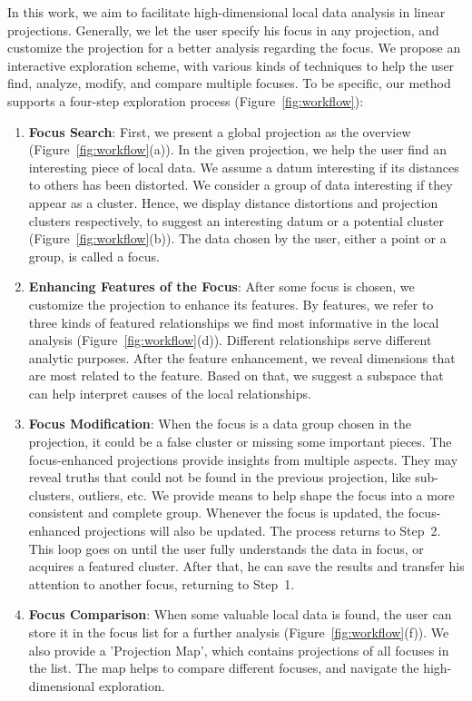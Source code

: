 In this work, we aim to facilitate high-dimensional local data analysis in linear projections. Generally, we let the user specify his focus in any projection, and customize the projection for a better analysis regarding the focus. We propose an interactive exploration scheme, with various kinds of techniques to help the user find, analyze, modify, and compare multiple focuses. To be specific, our method supports a four-step exploration process (Figure~\ref{fig:workflow}):
\begin{enumerate}[Step. 1:]
 \item \textbf{Focus Search}: First, we present a global projection as the overview (Figure~\ref{fig:workflow}(a)). In the given projection, we help the user find an interesting piece of local data. We assume a datum interesting if its distances to others has been distorted. We consider a group of data interesting if they appear as a cluster. Hence, we display distance distortions and projection clusters respectively, to suggest an interesting datum or a potential cluster (Figure~\ref{fig:workflow}(b)). The data chosen by the user, either a point or a group, is called a focus.
 \item \textbf{Enhancing Features of the Focus}: After some focus is chosen, we customize the projection to enhance its features. By features, we refer to three kinds of featured relationships we find most informative in the local analysis (Figure~\ref{fig:workflow}(d)). Different relationships serve different analytic purposes. After the feature enhancement, we reveal dimensions that are most related to the feature. Based on that, we suggest a subspace that can help interpret causes of the local relationships.
 \item \textbf{Focus Modification}: When the focus is a data group chosen in the projection, it could be a false cluster or missing some important pieces. The focus-enhanced projections provide insights from multiple aspects. They may reveal truths that could not be found in the previous projection, like sub-clusters, outliers, etc. We provide means to help shape the focus into a more consistent and complete group. Whenever the focus is updated, the focus-enhanced projections will also be updated. The process returns to Step~2. This loop goes on until the user fully understands the data in focus, or acquires a featured cluster. After that, he can save the results and transfer his attention to another focus, returning to Step~1.
 \item \textbf{Focus Comparison}: When some valuable local data is found, the user can store it in the focus list for a further analysis (Figure~\ref{fig:workflow}(f)). We also provide a 'Projection Map', which contains projections of all focuses in the list. The map helps to compare different focuses, and navigate the high-dimensional exploration.
\end{enumerate}
